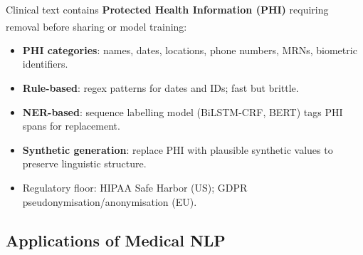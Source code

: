 \begin{tcbitemize}[ skin=sectionraster ]
    \tcbitem[title={De-identification and Privacy}, raster multicolumn=3]
    Clinical text contains \textbf{Protected Health Information (PHI)} requiring removal before sharing or model training\textsuperscript{\cite[][pp.~45--60]{itgovernanceprivacyteamEUGDPR2020}}:
    \begin{itemize}
        \item \textbf{PHI categories}: names, dates, locations, phone numbers, MRNs, biometric identifiers.
        \item \textbf{Rule-based}: regex patterns for dates and IDs; fast but brittle.
        \item \textbf{NER-based}: sequence labelling model (BiLSTM-CRF, BERT) tags PHI spans for replacement.
        \item \textbf{Synthetic generation}: replace PHI with plausible synthetic values to preserve linguistic structure.
        \item Regulatory floor: HIPAA Safe Harbor (US); GDPR pseudonymisation/anonymisation (EU).
    \end{itemize}
\end{tcbitemize}

\subsection{Applications of Medical NLP}

